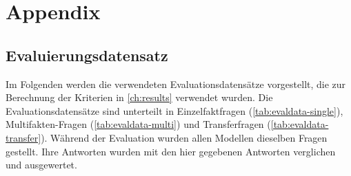 \chapter*{Appendix}\label{ch:appendix}
\section*{Evaluierungsdatensatz}\label{app:evaldata}
Im Folgenden werden die verwendeten Evaluationsdatensätze vorgestellt, die zur Berechnung der Kriterien in \cref{ch:results} verwendet wurden.
Die Evaluationsdatensätze sind unterteilt in Einzelfaktfragen (\cref{tab:evaldata-single}), Multifakten-Fragen (\cref{tab:evaldata-multi}) und Transferfragen (\cref{tab:evaldata-transfer}).
Während der Evaluation wurden allen Modellen dieselben Fragen gestellt. Ihre Antworten wurden mit den hier gegebenen Antworten verglichen und ausgewertet.
